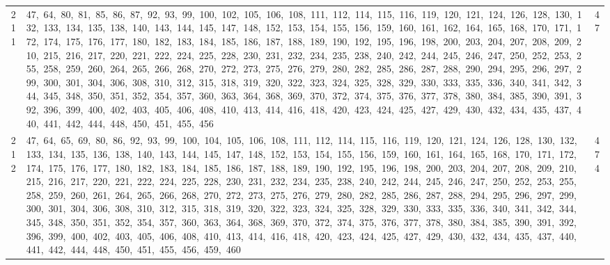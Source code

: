 \begin{longtable}{c|p{}|r}
211 & 47,\ 64,\ 80,\ 81,\ 85,\ 86,\ 87,\ 92,\ 93,\ 99,\ 100,\ 102,\ 105,\ 106,\ 108,\ 111,\ 112,\ 114,\ 115,\ 116,\ 119,\ 120,\ 121,\ 124,\ 126,\ 128,\ 130,\ 132,\ 133,\ 134,\ 135,\ 138,\ 140,\ 143,\ 144,\ 145,\ 147,\ 148,\ 152,\ 153,\ 154,\ 155,\ 156,\ 159,\ 160,\ 161,\ 162,\ 164,\ 165,\ 168,\ 170,\ 171,\ 172,\ 174,\ 175,\ 176,\ 177,\ 180,\ 182,\ 183,\ 184,\ 185,\ 186,\ 187,\ 188,\ 189,\ 190,\ 192,\ 195,\ 196,\ 198,\ 200,\ 203,\ 204,\ 207,\ 208,\ 209,\ 210,\ 215,\ 216,\ 217,\ 220,\ 221,\ 222,\ 224,\ 225,\ 228,\ 230,\ 231,\ 232,\ 234,\ 235,\ 238,\ 240,\ 242,\ 244,\ 245,\ 246,\ 247,\ 250,\ 252,\ 253,\ 255,\ 258,\ 259,\ 260,\ 264,\ 265,\ 266,\ 268,\ 270,\ 272,\ 273,\ 275,\ 276,\ 279,\ 280,\ 282,\ 285,\ 286,\ 287,\ 288,\ 290,\ 294,\ 295,\ 296,\ 297,\ 299,\ 300,\ 301,\ 304,\ 306,\ 308,\ 310,\ 312,\ 315,\ 318,\ 319,\ 320,\ 322,\ 323,\ 324,\ 325,\ 328,\ 329,\ 330,\ 333,\ 335,\ 336,\ 340,\ 341,\ 342,\ 344,\ 345,\ 348,\ 350,\ 351,\ 352,\ 354,\ 357,\ 360,\ 363,\ 364,\ 368,\ 369,\ 370,\ 372,\ 374,\ 375,\ 376,\ 377,\ 378,\ 380,\ 384,\ 385,\ 390,\ 391,\ 392,\ 396,\ 399,\ 400,\ 402,\ 403,\ 405,\ 406,\ 408,\ 410,\ 413,\ 414,\ 416,\ 418,\ 420,\ 423,\ 424,\ 425,\ 427,\ 429,\ 430,\ 432,\ 434,\ 435,\ 437,\ 440,\ 441,\ 442,\ 444,\ 448,\ 450,\ 451,\ 455,\ 456 & 47 \\
212 & 47,\ 64,\ 65,\ 69,\ 80,\ 86,\ 92,\ 93,\ 99,\ 100,\ 104,\ 105,\ 106,\ 108,\ 111,\ 112,\ 114,\ 115,\ 116,\ 119,\ 120,\ 121,\ 124,\ 126,\ 128,\ 130,\ 132,\ 133,\ 134,\ 135,\ 136,\ 138,\ 140,\ 143,\ 144,\ 145,\ 147,\ 148,\ 152,\ 153,\ 154,\ 155,\ 156,\ 159,\ 160,\ 161,\ 164,\ 165,\ 168,\ 170,\ 171,\ 172,\ 174,\ 175,\ 176,\ 177,\ 180,\ 182,\ 183,\ 184,\ 185,\ 186,\ 187,\ 188,\ 189,\ 190,\ 192,\ 195,\ 196,\ 198,\ 200,\ 203,\ 204,\ 207,\ 208,\ 209,\ 210,\ 215,\ 216,\ 217,\ 220,\ 221,\ 222,\ 224,\ 225,\ 228,\ 230,\ 231,\ 232,\ 234,\ 235,\ 238,\ 240,\ 242,\ 244,\ 245,\ 246,\ 247,\ 250,\ 252,\ 253,\ 255,\ 258,\ 259,\ 260,\ 261,\ 264,\ 265,\ 266,\ 268,\ 270,\ 272,\ 273,\ 275,\ 276,\ 279,\ 280,\ 282,\ 285,\ 286,\ 287,\ 288,\ 294,\ 295,\ 296,\ 297,\ 299,\ 300,\ 301,\ 304,\ 306,\ 308,\ 310,\ 312,\ 315,\ 318,\ 319,\ 320,\ 322,\ 323,\ 324,\ 325,\ 328,\ 329,\ 330,\ 333,\ 335,\ 336,\ 340,\ 341,\ 342,\ 344,\ 345,\ 348,\ 350,\ 351,\ 352,\ 354,\ 357,\ 360,\ 363,\ 364,\ 368,\ 369,\ 370,\ 372,\ 374,\ 375,\ 376,\ 377,\ 378,\ 380,\ 384,\ 385,\ 390,\ 391,\ 392,\ 396,\ 399,\ 400,\ 402,\ 403,\ 405,\ 406,\ 408,\ 410,\ 413,\ 414,\ 416,\ 418,\ 420,\ 423,\ 424,\ 425,\ 427,\ 429,\ 430,\ 432,\ 434,\ 435,\ 437,\ 440,\ 441,\ 442,\ 444,\ 448,\ 450,\ 451,\ 455,\ 456,\ 459,\ 460 & 474 \\

\end{longtable}

